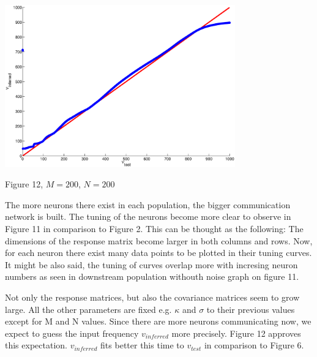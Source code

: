 \documentclass{article}
\begin{document}
\begin{center}
\includegraphics[width=\textwidth, height=70mm]{MN_big2.eps}
\begin{footnotesize}
 Figure 12, $M=200$, $N=200$
\end{footnotesize}
\end{center}

The more neurons there exist in each population, the bigger communication network is built. The tuning of the neurons become more clear to observe in Figure 11 in comparison to Figure 2. This can be thought as the following: The dimensions of the response matrix become larger in both columns and rows. Now, for each neuron there exist many data points to be plotted in their tuning curves. It might be also said, the tuning of curves overlap more with incresing neuron numbers as seen in downstream population withouth noise graph on figure 11.

Not only the response matrices, but also the covariance matrices seem to grow large. All the other parameters are fixed e.g. $\kappa$ and $\sigma$ to their previous values except for M and N values. Since there are more neurons communicating now, we expect to guess the input frequency $v_{inferred}$ more precisely. Figure 12 approves this expectation. $v_{inferred}$ fits better this time to $v_{test}$ in comparison to Figure 6.
\end{document}
